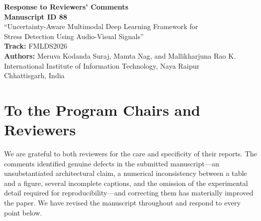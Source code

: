 \begin{singlespace}
\begin{center}
{\large\bfseries Response to Reviewers' Comments}\\[0.5\baselineskip]
{\normalsize\bfseries Manuscript ID 88}\\[0.25\baselineskip]
{\normalsize ``Uncertainty-Aware Multimodal Deep Learning Framework for\\
Stress Detection Using Audio-Visual Signals''}\\[0.5\baselineskip]
{\normalsize\textbf{Track:} FMLDS2026}\\[0.75\baselineskip]
{\normalsize\textbf{Authors:} Meruva Kodanda Suraj, Mamta Nag, and Mallikharjuna Rao K.}\\[0.25\baselineskip]
{\normalsize International Institute of Information Technology, Naya Raipur}\\[0.25\baselineskip]
{\normalsize Chhattisgarh, India}
\end{center}
\end{singlespace}

\vspace{0.5\baselineskip}

\begin{singlespace}
\noindent{}
\end{singlespace}

\vspace{0.5\baselineskip}

\section*{To the Program Chairs and Reviewers}

We are grateful to both reviewers for the care and specificity of their
reports. The comments identified genuine defects in the submitted
manuscript---an unsubstantiated architectural claim, a numerical
inconsistency between a table and a figure, several incomplete captions,
and the omission of the experimental detail required for
reproducibility---and correcting them has materially improved the paper.
We have revised the manuscript throughout and respond to every point
below.

